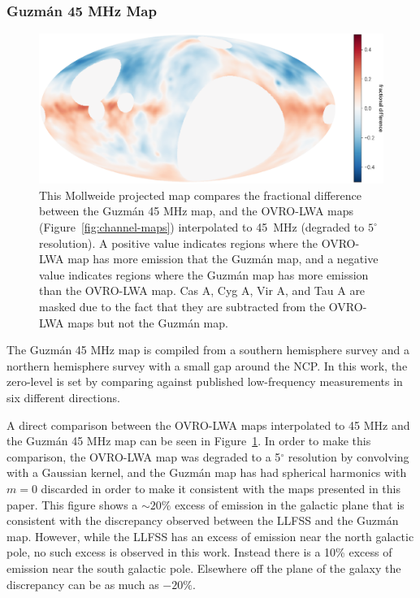 \documentclass[twocolumn]{aastex61}
\begin{document}
\subsubsection{Guzm\'{a}n 45 MHz Map}

\begin{figure}[t]
    \centering
    \includegraphics[height=0.32\textheight]{figures/guzman/guzman}
    \caption{
        This Mollweide projected map compares the fractional difference between the Guzm\'{a}n 45
        MHz map, and the OVRO-LWA maps (Figure~\ref{fig:channel-maps}) interpolated to 45~MHz
        (degraded to $5^\circ$ resolution). A positive value indicates regions where the OVRO-LWA
        map has more emission that the Guzm\'{a}n map, and a negative value indicates regions where
        the Guzm\'{a}n map has more emission than the OVRO-LWA map. Cas A, Cyg A, Vir A, and Tau A
        are masked due to the fact that they are subtracted from the OVRO-LWA maps but not the
        Guzm\'{a}n map.
    }
    \label{fig:guzman-comparison}
\end{figure}

The Guzm\'{a}n 45 MHz map \citep{2011A&A...525A.138G} is compiled from a southern hemisphere survey
\citep{1997A&AS..124..315A} and a northern hemisphere survey \citep{1999A&AS..140..145M} with a
small gap around the NCP. In this work, the zero-level is set by comparing against published
low-frequency measurements in six different directions.

A direct comparison between the OVRO-LWA maps interpolated to 45 MHz and the Guzm\'{a}n 45 MHz map
can be seen in Figure~\ref{fig:guzman-comparison}. In order to make this comparison, the OVRO-LWA
map was degraded to a 5$^\circ$ resolution by convolving with a Gaussian kernel, and the Guzm\'{a}n
map has had spherical harmonics with $m=0$ discarded in order to make it consistent with the maps
presented in this paper. This figure shows a $\sim20\%$ excess of emission in the galactic plane
that is consistent with the discrepancy observed between the LLFSS and the Guzm\'{a}n map.  However,
while the LLFSS has an excess of emission near the north galactic pole, no such excess is observed
in this work. Instead there is a 10\% excess of emission near the south galactic pole. Elsewhere off
the plane of the galaxy the discrepancy can be as much as $-20\%$.
\end{document}
